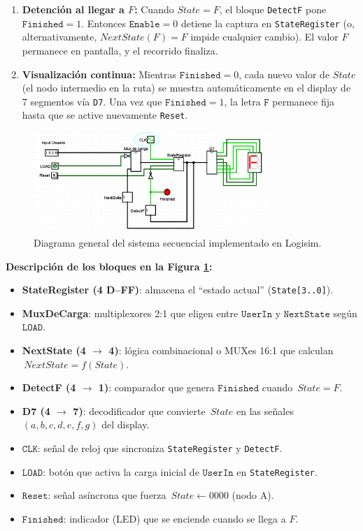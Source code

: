 \documentclass[12pt]{article}
\begin{document}
\begin{enumerate}
  \item \textbf{Detención al llegar a \(F\):}  
        Cuando \(State = F\), el bloque \texttt{DetectF} pone \(\texttt{Finished} = 1\). Entonces  
        \(\texttt{Enable} = 0\) detiene la captura en \texttt{StateRegister} (o, alternativamente, 
        \(NextState(F)=F\) impide cualquier cambio). El valor \(F\) permanece en pantalla, 
        y el recorrido finaliza.

  \item \textbf{Visualización continua:}  
        Mientras \(\texttt{Finished} = 0\), cada nuevo valor de \(State\) (el nodo intermedio en la ruta)
        se muestra automáticamente en el display de 7 segmentos vía \texttt{D7}. Una vez que 
        \(\texttt{Finished} = 1\), la letra \(\texttt{F}\) permanece fija hasta que se active nuevamente  
        \texttt{Reset}.
\end{enumerate}

\begin{figure}[H]
  \centering
  \includegraphics[width=0.8\textwidth]{.github/maincircuit.png}
  \caption{Diagrama general del sistema secuencial implementado en Logisim.}
  \label{fig:main_circuit}
\end{figure}

\noindent
\textbf{Descripción de los bloques en la Figura \ref{fig:main_circuit}:}
\begin{itemize}
  \item \textbf{StateRegister (4 D–FF)}: almacena el “estado actual” (\texttt{State[3..0]}).  
  \item \textbf{MuxDeCarga}: multiplexores 2:1 que eligen entre \(\texttt{UserIn}\) y 
        \(\texttt{NextState}\) según \(\texttt{LOAD}\).  
  \item \textbf{NextState (4 \(\to\) 4)}: lógica combinacional o MUXes 16:1 que calculan 
        \(\,NextState = f(State)\).  
  \item \textbf{DetectF (4 \(\to\) 1)}: comparador que genera \(\texttt{Finished}\) cuando 
        \(\,State = F\).  
  \item \textbf{D7 (4 \(\to\) 7)}: decodificador que convierte \(\,State\) en las señales 
        \((a,b,c,d,e,f,g)\) del display.  
  \item \(\texttt{CLK}\): señal de reloj que sincroniza \texttt{StateRegister} y \texttt{DetectF}.  
  \item \(\texttt{LOAD}\): botón que activa la carga inicial de \(\texttt{UserIn}\) en \texttt{StateRegister}.  
  \item \(\texttt{Reset}\): señal asíncrona que fuerza \(\,State \leftarrow 0000\) (nodo A).  
  \item \(\texttt{Finished}\): indicador (LED) que se enciende cuando se llega a \(F\).  
\end{itemize}
\end{document}

